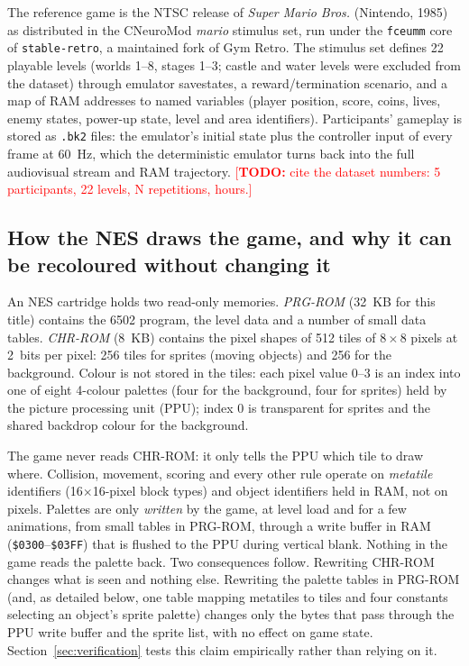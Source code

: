 \documentclass{article}
\newcommand{\TODO}[1]{\textcolor{red}{[\textbf{TODO:} #1]}}
\newcommand{\hex}[1]{\texttt{\$#1}}
\begin{document}
The reference game is the NTSC release of \textit{Super Mario Bros.} (Nintendo, 1985) as
distributed in the CNeuroMod \textit{mario} stimulus set\cite{paugam2025mario}, run under the
\texttt{fceumm} core\cite{fceumm} of \texttt{stable-retro}\cite{stableretro}, a maintained fork
of Gym Retro\cite{openai2018gymretro}. The stimulus set defines 22 playable levels (worlds 1--8,
stages 1--3; castle and water levels were excluded from the dataset) through emulator savestates,
a reward/termination scenario, and a map of RAM addresses to named variables (player position,
score, coins, lives, enemy states, power-up state, level and area identifiers). Participants'
gameplay is stored as \texttt{.bk2} files: the emulator's initial state plus the controller input
of every frame at 60~Hz, which the deterministic emulator turns back into the full audiovisual
stream and RAM trajectory. \TODO{cite the dataset numbers: 5 participants, 22 levels, N
repetitions, hours.}

\subsection{How the NES draws the game, and why it can be recoloured without changing it}
\label{sec:nes}

An NES cartridge holds two read-only memories\cite{nesdev}. \emph{PRG-ROM} (32~KB for this
title) contains the 6502 program, the level data and a number of small data tables.
\emph{CHR-ROM} (8~KB) contains the pixel shapes of 512 tiles of $8\times8$ pixels at 2~bits per
pixel: 256 tiles for sprites (moving objects) and 256 for the background. Colour is not stored in
the tiles: each pixel value 0--3 is an index into one of eight 4-colour palettes (four for the
background, four for sprites) held by the picture processing unit (PPU); index 0 is transparent
for sprites and the shared backdrop colour for the background.

The game never reads CHR-ROM: it only tells the PPU which tile to draw where. Collision,
movement, scoring and every other rule operate on \emph{metatile} identifiers (16$\times$16-pixel
block types) and object identifiers held in RAM, not on pixels. Palettes are only \emph{written}
by the game, at level load and for a few animations, from small tables in PRG-ROM, through a
write buffer in RAM (\hex{0300}--\hex{03FF}) that is flushed to the PPU during vertical blank.
Nothing in the game reads the palette back. Two consequences follow. Rewriting CHR-ROM changes
what is seen and nothing else. Rewriting the palette tables in PRG-ROM (and, as detailed below,
one table mapping metatiles to tiles and four constants selecting an object's sprite palette)
changes only the bytes that pass through the PPU write buffer and the sprite list, with no effect
on game state. Section~\ref{sec:verification} tests this claim empirically rather than relying on
it.
\end{document}
